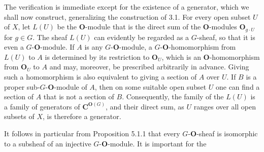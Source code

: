 The verification is immediate except for the existence of a generator, which
we shall now construct, generalizing the construction of 3.1.
For every open subset $U$ of $X$, let $L(U)$ be the ${\mathbf O}$-module that is the
direct sum of the ${\mathbf O}$-modules ${\mathbf O}_{g\cdot U}$ for $g\in G$. The sheaf $L(U)$
can evidently be regarded as a $G$-sheaf, so that it is even a
$G$-${\mathbf O}$-module. If $A$ is any $G$-${\mathbf O}$-module, a $G$-${\mathbf O}$-homomorphism from
$L(U)$ to $A$ is determined by its restriction to ${\mathbf O}_U$, which is an
${\mathbf O}$-homomorphism from ${\mathbf O}_U$ to $A$ and may, moreover, be prescribed
arbitrarily in advance. Giving such a homomorphism is also equivalent to
giving a section of $A$ over $U$.
If $B$ is a proper sub-$G$-${\mathbf O}$-module of $A$, then on some suitable open
subset $U$ one can find a section of $A$ that is not a section of $B$.
Consequently, the family of the $L(U)$ is a family of generators of
${\mathbf C}^{{\mathbf O}(G)}$, and their direct sum, as $U$ ranges over all open subsets of $X$,
is therefore a generator.

It follows in particular from Proposition 5.1.1 that every $G$-${\mathbf O}$-sheaf is
isomorphic to a subsheaf of an injective $G$-${\mathbf O}$-module. It is important for
the


